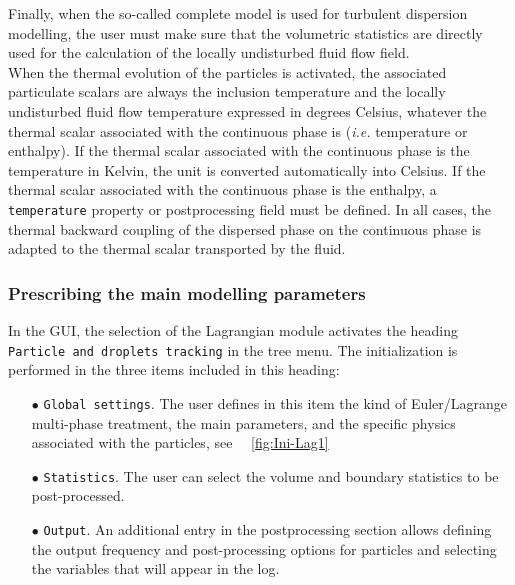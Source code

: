 Finally, when the so-called complete model is used for turbulent dispersion modelling, the user must make sure that the volumetric statistics are directly used for the calculation of the locally undisturbed fluid flow field.\\

When the thermal evolution of the particles is activated, the associated particulate scalars are always the inclusion temperature and the locally undisturbed fluid flow temperature expressed in degrees Celsius, whatever the thermal scalar associated with the continuous phase is ({\em i.e.} temperature or enthalpy). If the
thermal scalar associated with the continuous phase is the temperature in Kelvin, the unit is converted automatically into Celsius. If the thermal scalar associated with the continuous phase is the enthalpy, a \texttt{temperature} property or postprocessing
field must be defined. In all cases, the thermal backward coupling of the dispersed phase on the continuous phase is adapted to the thermal scalar transported by the fluid.


\subsubsection{Prescribing the main modelling parameters}\label{sec:Ini-lag}


In the GUI, the selection of the Lagrangian module activates the heading \texttt{Particle and droplets tracking} in the tree menu. The initialization is performed in the three items included in this heading:
%
\begin{itemize}
 \item [$\bullet$] \texttt{Global settings}. The user defines in this item the kind of Euler/Lagrange multi-phase treatment, the main parameters, and the specific physics associated with the particles, see ~\figurename~\ref {fig:Ini-Lag1} %
 \item [$\bullet$] \texttt{Statistics}. The user can select the volume and boundary statistics to be post-processed.
 \item [$\bullet$] \texttt{Output}. An additional entry in the postprocessing section allows defining the output frequency and post-processing options for particles and selecting the variables that will appear in the log.
\end{itemize}

